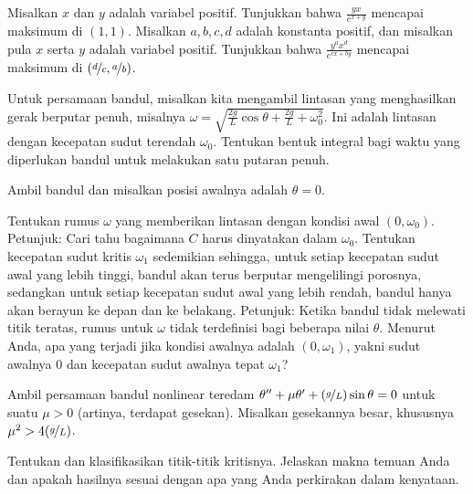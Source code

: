 \begin{exercise}
\leavevmode
\begin{tasks}
\task Misalkan $x$ dan $y$ adalah variabel positif. Tunjukkan bahwa
$\frac{y x}{e^{x+y}}$ mencapai maksimum di $(1,1)$.
\task Misalkan $a,b,c,d$ adalah konstanta positif, dan misalkan pula $x$ serta
$y$ adalah variabel positif. Tunjukkan bahwa
$\frac{y^a x^d}{e^{cx+by}}$ mencapai maksimum di
$(\nicefrac{d}{c},\nicefrac{a}{b})$.
\end{tasks}
\end{exercise}

\begin{exercise}
Untuk persamaan bandul, misalkan kita mengambil lintasan yang menghasilkan
gerak berputar penuh, misalnya
$\omega = \sqrt{\frac{2g}{L} \cos \theta
+ \frac{2g}{L} + \omega_0^2}$. Ini adalah lintasan dengan kecepatan sudut
terendah $\omega_0$. Tentukan bentuk integral bagi waktu yang diperlukan
bandul untuk melakukan satu putaran penuh.
\end{exercise}

\begin{exercise}[menantang]
Ambil bandul dan misalkan posisi awalnya adalah $\theta = 0$.
\begin{tasks}
\task
Tentukan rumus $\omega$ yang memberikan lintasan dengan kondisi
awal $(0,\omega_0)$. Petunjuk: Cari tahu bagaimana $C$ harus dinyatakan dalam
$\omega_0$.
\task
Tentukan kecepatan sudut kritis $\omega_1$ sedemikian sehingga, untuk setiap
kecepatan sudut awal yang lebih tinggi, bandul akan terus berputar
mengelilingi porosnya, sedangkan untuk setiap kecepatan sudut awal yang lebih
rendah, bandul hanya akan berayun ke depan dan ke belakang.
Petunjuk: Ketika bandul tidak melewati titik teratas, rumus untuk
$\omega$ tidak terdefinisi bagi beberapa nilai $\theta$.
\task
Menurut Anda, apa yang terjadi jika kondisi awalnya adalah $(0,\omega_1)$,
yakni sudut awalnya 0 dan kecepatan sudut awalnya tepat $\omega_1$?
\end{tasks}
\end{exercise}

\setcounter{exercise}{100}

\begin{exercise}
Ambil persamaan bandul nonlinear teredam $\theta '' + \mu \theta' +
(\nicefrac{g}{L})
\sin \theta = 0$ untuk suatu $\mu > 0$ (artinya, terdapat gesekan).
Misalkan gesekannya besar, khususnya $\mu^2 > 4 (\nicefrac{g}{L})$.
\begin{tasks}
\task
Tentukan dan klasifikasikan titik-titik kritisnya.
\task
Jelaskan makna temuan Anda dan apakah hasilnya sesuai dengan apa yang
Anda perkirakan dalam kenyataan.
\end{tasks}
\end{exercise}

